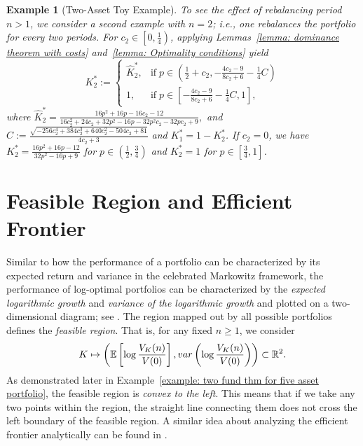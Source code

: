 \documentclass[10pt]{article} %
\newtheorem{example}{Example}[section]
\begin{document}
\begin{example}[Two-Asset Toy Example]
		To see the effect of rebalancing period $n > 1$, we consider a second example with $n=2$; i.e., one rebalances the portfolio for every two periods.
		For $c_2 \in \left[0, \frac{1}{4}\right)$, applying Lemmas~\ref{lemma: dominance theorem with costs} and~\ref{lemma: Optimality conditions} yield
		\begin{equation}
			K_2^* := 
			\begin{cases}
				\widehat{K}_2^*, & \text{if} \; p\in \left( \frac{1}{2}+c_2, -\frac{4c_2-9}{8c_2+6}-\frac{1}{4}C\right)\\
				1, & \text{if} \; p\in \left[ -\frac{4c_2-9}{8c_2+6}-\frac{1}{4}C, 1\right],
			\end{cases}
		\end{equation}
		where 
		$
		\widehat{K}_2^* = \frac{16p^2+16p-16c_2-12}{16c_2^2+24c_2+32p^2-16p-32p^2c_2-32pc_2+9},
		$
		and
		$
		C := \frac{\sqrt{-256c_2^4+384c_2^3+640c_2^2-504c_2+81}}{4c_2+3}
		$ and $K_1^* = 1-K_2^*$.
		If $c_2=0$, we have $K_2^*=\frac{16p^2+16p-12}{32p^2-16p+9}$ for $ p \in \left(\frac{1}{2}, \frac{3}{4}\right)$ and $K_2^*=1$ for $p \in \left[\frac{3}{4}, 1\right]$. 
	\end{example}
	
	
	
	\section{Feasible Region and Efficient Frontier}
	Similar to how the performance of a portfolio can be characterized by its expected return and variance in the celebrated Markowitz framework, the performance of log-optimal portfolios can be characterized by the \textit{expected logarithmic growth} and \textit{variance of the logarithmic growth} and plotted on a two-dimensional diagram; see \cite{luenberger2013investment}.
	The region mapped out by all possible portfolios defines the \textit{feasible region}. 
	That is, for any fixed $n \geq 1$,  we consider
	\[
	K \mapsto \left( \mathbb{E}\left[ \log \frac{V_K(n)}{V(0)} \right], {\rm var}\left(\log \frac{V_K(n)}{V(0)} \right) \right) \subset \mathbb{R}^2.
	\]
	As demonstrated later in Example~\ref{example: two fund thm for five asset portfolio}, the feasible region is \textit{convex to the left}. This means that if we take any two points within the region, the straight line connecting them does not cross the left boundary of the feasible region.
	A similar idea about analyzing the efficient frontier analytically can be found in \cite{merton1972analytic}.
	
\end{document}
